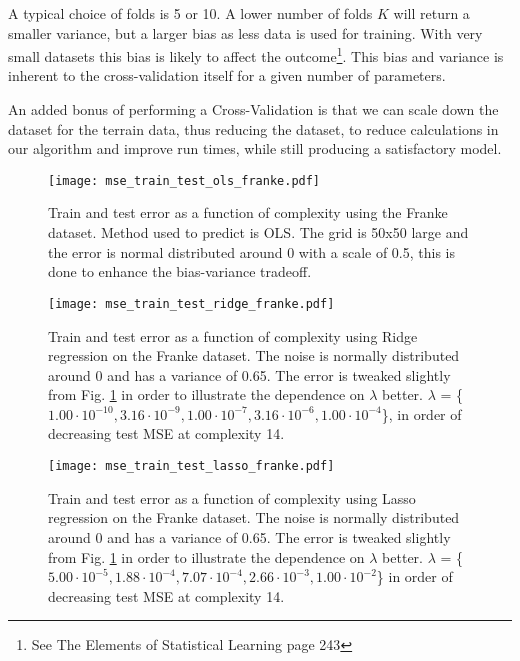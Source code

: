 \documentclass[%
 reprint,
nofootinbib,
 amsmath,amssymb,
 aps,
]{revtex4-2}
\begin{document}
A typical choice of folds is 5 or 10. A lower number of folds $K$ will return a smaller variance, but a larger bias as less data is used for training. With very small datasets this bias is likely to affect the outcome\footnote{See The Elements of Statistical Learning \cite{Hastie} page 243}. This bias and variance is inherent to the cross-validation itself for a given number of parameters.

An added bonus of performing a Cross-Validation is that we can scale down the dataset for the terrain data, thus reducing the dataset, to reduce calculations in our algorithm and improve run times, while still producing a satisfactory model.

\begin{figure}[b]
\texttt{[image: mse\_train\_test\_ols\_franke.pdf]}
\caption{\label{fig:mse_train_test_ols_franke_eps05} Train and test error as a function of complexity using the Franke dataset. Method used to predict is OLS. The grid is 50x50 large and the error is normal distributed around 0 with a scale of 0.5, this is done to enhance the bias-variance tradeoff.}
\end{figure}

\begin{figure}[h!]
\texttt{[image: mse\_train\_test\_ridge\_franke.pdf]}
\caption{\label{fig:mse_train_test_ridge_franke_eps065} Train and test error as a function of complexity using Ridge regression on the Franke dataset. The noise is normally distributed around 0 and has a variance of 0.65. The error is tweaked slightly from Fig. \ref{fig:mse_train_test_ols_franke_eps05} in order to illustrate the dependence on $\lambda$ better. $\lambda$ = \{$1.00 \cdot 10^{-10}, 3.16 \cdot 10^{-9}, 1.00 \cdot 10^{-7}, 3.16 \cdot 10^{-6}, 1.00 \cdot 10^{-4} $\}, in order of decreasing test MSE at complexity 14.}
\end{figure}

\begin{figure}[h!]
\texttt{[image: mse\_train\_test\_lasso\_franke.pdf]}
\caption{\label{fig:mse_train_test_lasso_franke_eps065} Train and test error as a function of complexity using Lasso regression on the Franke dataset. The noise is normally distributed around 0 and has a variance of 0.65. The error is tweaked slightly from Fig. \ref{fig:mse_train_test_ols_franke_eps05} in order to illustrate the dependence on $\lambda$ better. $\lambda$ = \{$5.00 \cdot 10^{-5}, 1.88 \cdot 10^{-4}, 7.07 \cdot 10^{-4}, 2.66 \cdot 10^{-3}, 1.00 \cdot 10^{-2} $\} in order of decreasing test MSE at complexity 14.}
\end{figure}
\end{document}
